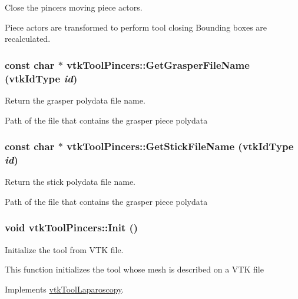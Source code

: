 Close the pincers moving piece actors. 

Piece actors are transformed to perform tool closing Bounding boxes are recalculated. \hypertarget{classvtkToolPincers_a1f673edc2bee876530a721833f1c77f1}{
\subsubsection[{GetGrasperFileName}]{\setlength{\rightskip}{0pt plus 5cm}const char $\ast$ vtkToolPincers::GetGrasperFileName (vtkIdType {\em id})}}
\label{classvtkToolPincers_a1f673edc2bee876530a721833f1c77f1}


Return the grasper polydata file name. 

Path of the file that contains the grasper piece polydata \hypertarget{classvtkToolPincers_acb1210b1b77be2a7030b05c3b9e63ff5}{
\subsubsection[{GetStickFileName}]{\setlength{\rightskip}{0pt plus 5cm}const char $\ast$ vtkToolPincers::GetStickFileName (vtkIdType {\em id})}}
\label{classvtkToolPincers_acb1210b1b77be2a7030b05c3b9e63ff5}


Return the stick polydata file name. 

Path of the file that contains the grasper piece polydata \hypertarget{classvtkToolPincers_ae4918610073324c94dddd8da234742a9}{
\subsubsection[{Init}]{\setlength{\rightskip}{0pt plus 5cm}void vtkToolPincers::Init ()}}
\label{classvtkToolPincers_ae4918610073324c94dddd8da234742a9}


Initialize the tool from VTK file. 

This function initializes the tool whose mesh is described on a VTK file 

Implements \hyperlink{classvtkToolLaparoscopy_ace75ea21a3ddb27547976ddea0ebb60e}{vtkToolLaparoscopy}.

